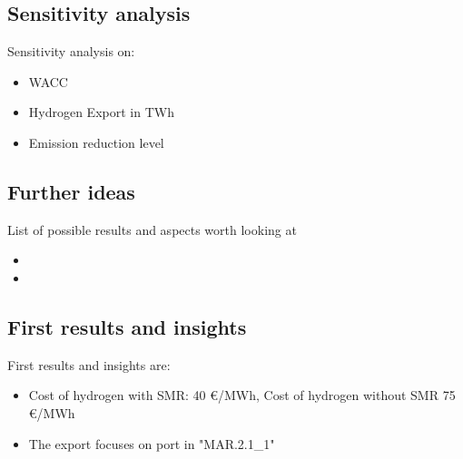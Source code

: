 \subsection{Sensitivity analysis}
Sensitivity analysis on:
\begin{itemize}
    \item WACC
    \item Hydrogen Export in TWh
    \item Emission reduction level
\end{itemize}


\subsection{Further ideas}
List of possible results and aspects worth looking at
\begin{itemize}
    \item 
    \item 
\end{itemize}


\subsection{First results and insights}

First results and insights are:
\begin{itemize}
    \item Cost of hydrogen with SMR: 40 €/MWh, Cost of hydrogen without SMR 75 €/MWh
    \item The export focuses on port in "MAR.2.1_1"
\end{itemize}
